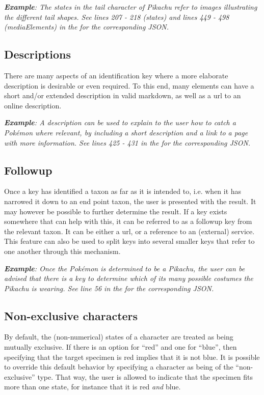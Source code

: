 \documentclass[10pt,letterpaper]{article}
\begin{document}
\textit{\textbf{Example}: The states in the tail character of Pikachu refer to images illustrating the different tail shapes. See lines 207 - 218 (states) and lines 449 - 498 (mediaElements) in the  for the corresponding JSON.}
\subsection*{
Descriptions
}
There are many aspects of an identification key where a more elaborate description is desirable or even required. To this end, many elements can have a short and/or extended description in valid markdown, as well as a url to an online description.

\textit{\textbf{Example}: A description can be used to explain to the user how to catch a Pokémon where relevant, by including a short description and a link to a page with more information. See lines 425 - 431 in the  for the corresponding JSON.}
\subsection*{
Followup
}
Once a key has identified a taxon as far as it is intended to, i.e. when it has narrowed it down to an end point taxon, the user is presented with the result. It may however be possible to further determine the result. If a key exists somewhere that can help with this, it can be referred to as a followup key from the relevant taxon. It can be either a url, or a reference to an (external) service. This feature can also be used to split keys into several smaller keys that refer to one another through this mechanism.

\textit{\textbf{Example}: Once the Pokémon is determined to be a Pikachu, the user can be advised that there is a key to determine which of its many possible costumes the Pikachu is wearing. See line 56 in the  for the corresponding JSON.}
\subsection*{
Non-exclusive characters
}
By default, the (non-numerical) states of a character are treated as being mutually exclusive. If there is an option for ``red'' and one for ``blue'', then specifying that the target specimen is red implies that it is not blue. It is possible to override this default behavior by specifying a character as being of the ``non-exclusive'' type. That way, the user is allowed to indicate that the specimen fits more than one state, for instance that it is red \textit{and} blue.
\end{document}
